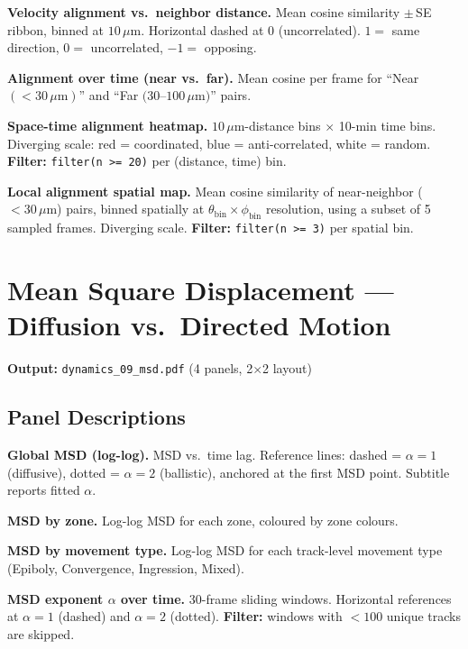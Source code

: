 \documentclass[11pt,a4paper]{article}
\newcommand{\um}{\,\mu\text{m}}
\begin{document}
\begin{description}[style=nextline,leftmargin=1.5cm]
  \item[08a] \textbf{Velocity alignment vs.\ neighbor distance.}
    Mean cosine similarity $\pm$\,SE ribbon, binned at $10\um$.
    Horizontal dashed at 0 (uncorrelated).
    $1 =$ same direction, $0 =$ uncorrelated, $-1 =$ opposing.

  \item[08b] \textbf{Alignment over time (near vs.\ far).}
    Mean cosine per frame for ``Near $(<30\um)$'' and ``Far $(30$--$100\um)$''
    pairs.

  \item[08c] \textbf{Space-time alignment heatmap.}
    $10\um$-distance bins $\times$ 10-min time bins.  Diverging scale:
    red = coordinated, blue = anti-correlated, white = random.
    \textbf{Filter:} \texttt{filter(n >= 20)} per (distance, time) bin.

  \item[08d] \textbf{Local alignment spatial map.}
    Mean cosine similarity of near-neighbor ($< 30\um$) pairs, binned
    spatially at $\theta_\mathrm{bin} \times \phi_\mathrm{bin}$ resolution,
    using a subset of 5 sampled frames.  Diverging scale.
    \textbf{Filter:} \texttt{filter(n >= 3)} per spatial bin.
\end{description}


\section{Mean Square Displacement --- Diffusion vs.\ Directed Motion}
\label{fig:msd}

\noindent\textbf{Output:} \texttt{dynamics\_09\_msd.pdf}
(4 panels, 2$\times$2 layout)

\subsection*{Panel Descriptions}

\begin{description}[style=nextline,leftmargin=1.5cm]
  \item[09a] \textbf{Global MSD (log-log).}
    MSD vs.\ time lag.  Reference lines:
    dashed = $\alpha=1$ (diffusive), dotted = $\alpha=2$ (ballistic),
    anchored at the first MSD point.  Subtitle reports fitted $\alpha$.

  \item[09b] \textbf{MSD by zone.}
    Log-log MSD for each zone, coloured by zone colours.

  \item[09c] \textbf{MSD by movement type.}
    Log-log MSD for each track-level movement type (Epiboly, Convergence,
    Ingression, Mixed).

  \item[09d] \textbf{MSD exponent $\alpha$ over time.}
    30-frame sliding windows.  Horizontal references at $\alpha=1$ (dashed)
    and $\alpha=2$ (dotted).
    \textbf{Filter:} windows with $< 100$ unique tracks are skipped.
\end{description}
\end{document}
